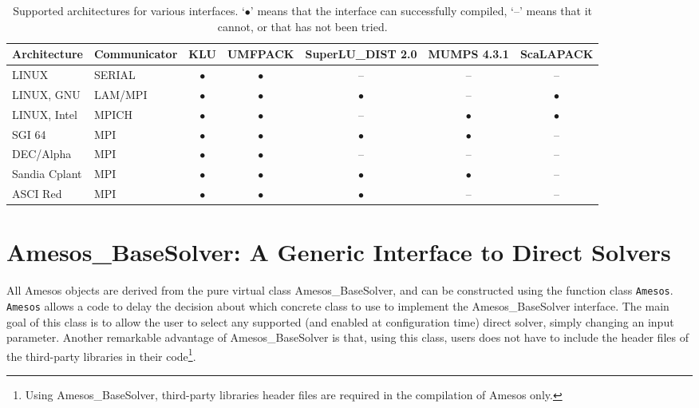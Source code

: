 \documentclass[11pt]{SANDreport}
\begin{document}
\begin{sidewaystable}[tbhp]
  \centering
  \begin{tabular}{| l  l | c | c | c | c | c | }
    \hline
    Architecture & Communicator & KLU & UMFPACK & SuperLU\_DIST 2.0 &
    MUMPS 4.3.1 & ScaLAPACK    \\
    \hline
    LINUX & SERIAL & $\bullet$ & $\bullet$ & -- & -- & -- \\
    LINUX, GNU & LAM/MPI  &$\bullet$  & $\bullet$ & $\bullet$
    & -- & $\bullet$ \\
    LINUX, Intel & MPICH  &$\bullet$  & $\bullet$ & -- 
    & $\bullet$ & $\bullet$ \\
    SGI 64 & MPI & $\bullet$ & $\bullet$ & $\bullet$ & $\bullet$ & -- \\
    DEC/Alpha & MPI & $\bullet$ & $\bullet$ & -- & -- & -- \\
    Sandia Cplant & MPI & $\bullet$ & $\bullet$ & $\bullet$ & $\bullet$ & -- \\
    ASCI Red & MPI & $\bullet$ & $\bullet$ & $\bullet$ & -- & -- \\
    \hline
  \end{tabular}
  \caption{Supported architectures for various interfaces. 
  `$\bullet$' means that the interface can successfully compiled, 
  `--' means that it cannot, or that has not been tried.}
  \label{tab:arch}
\end{sidewaystable}


\section{Amesos\_BaseSolver: A Generic Interface to Direct Solvers}
\label{sec:amesos_generic}

All Amesos objects are derived from the pure virtual class
Amesos\_BaseSolver, and can be constructed using the function class
\verb!Amesos!.  \verb!Amesos! allows a code to delay the decision about
which concrete class to use to implement the Amesos\_BaseSolver
interface. The main goal of this class is to allow the user to select
any supported (and enabled at configuration time) direct solver, simply
changing an input parameter. Another remarkable advantage of
Amesos\_BaseSolver is that, using this class, users does not have to
include the header files of the third-party libraries in their
code\footnote{Using Amesos\_BaseSolver, third-party libraries header
  files are required in the compilation of Amesos only.}.
\end{document}
